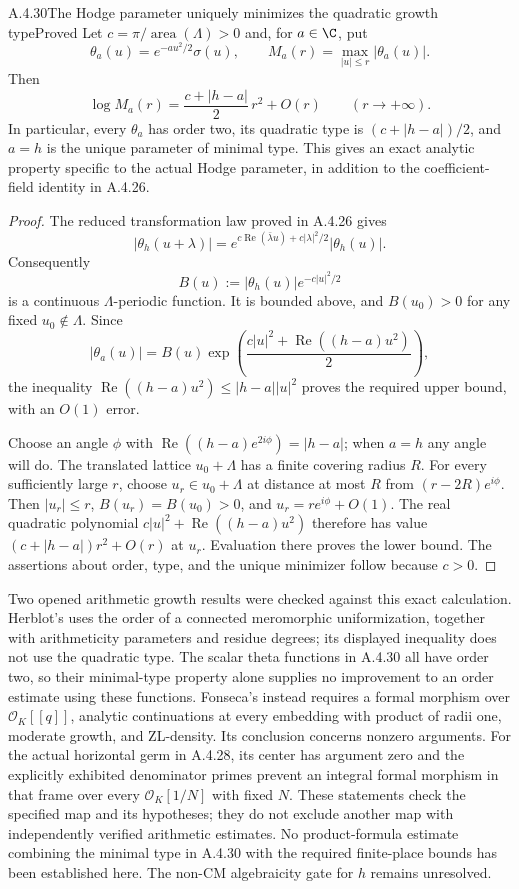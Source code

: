 \begin{result}{A.4.30}{The Hodge parameter uniquely minimizes the quadratic growth type}{Proved}
Let $c=\pi/\operatorname{area}(\Lambda)>0$ and, for $a\in\C$, put
\[
 \theta_a(u)=e^{-au^2/2}\sigma(u),\qquad
 M_a(r)=\max_{|u|\le r}|\theta_a(u)|.
\]
Then
\[
 \log M_a(r)=\frac{c+|h-a|}{2}\,r^2+O(r)
 \qquad(r\longrightarrow+\infty).
\]
In particular, every $\theta_a$ has order two, its quadratic type is
$(c+|h-a|)/2$, and $a=h$ is the unique parameter of minimal type.
This gives an exact analytic property specific to the actual Hodge
parameter, in addition to the coefficient-field identity in A.4.26.
\end{result}
\begin{proof}
The reduced transformation law proved in A.4.26 gives
\[
 |\theta_h(u+\lambda)|
 =e^{c\operatorname{Re}(\bar\lambda u)+c|\lambda|^2/2}
   |\theta_h(u)|.
\]
Consequently
\[
 B(u):=|\theta_h(u)|e^{-c|u|^2/2}
\]
is a continuous $\Lambda$-periodic function. It is bounded above,
and $B(u_0)>0$ for any fixed $u_0\notin\Lambda$. Since
\[
 |\theta_a(u)|=
 B(u)\exp\!\left(\frac{c|u|^2+
                 \operatorname{Re}((h-a)u^2)}2\right),
\]
the inequality
$\operatorname{Re}((h-a)u^2)\le |h-a||u|^2$
proves the required upper bound, with an $O(1)$ error.

Choose an angle $\phi$ with
$\operatorname{Re}((h-a)e^{2i\phi})=|h-a|$; when $a=h$ any
angle will do. The translated lattice $u_0+\Lambda$ has a finite
covering radius $R$. For every sufficiently large $r$, choose
$u_r\in u_0+\Lambda$ at distance at most $R$ from
$(r-2R)e^{i\phi}$. Then $|u_r|\le r$, $B(u_r)=B(u_0)>0$, and
$u_r=re^{i\phi}+O(1)$. The real quadratic polynomial
$c|u|^2+\operatorname{Re}((h-a)u^2)$ therefore has value
$(c+|h-a|)r^2+O(r)$ at $u_r$. Evaluation there proves the lower
bound. The assertions about order, type, and the unique minimizer
follow because $c>0$.
\end{proof}

Two opened arithmetic growth results were checked against this exact
calculation. Herblot's \cite[Theorem 6.1, pp.31--32]{EllHerblot2012}
uses the order of a connected meromorphic uniformization, together
with arithmeticity parameters and residue degrees; its displayed
inequality does not use the quadratic type. The scalar theta
functions in A.4.30 all have order two, so their minimal-type
property alone supplies no improvement to an order estimate using
these functions.
Fonseca's \cite[Theorem 1.2, p.648]{EllFonseca2019} instead requires
a formal morphism over $\mathcal O_K[[q]]$, analytic continuations at
every embedding with product of radii one, moderate growth, and
ZL-density. Its conclusion concerns nonzero arguments.
For the actual horizontal germ in A.4.28, its center has argument
zero and the explicitly exhibited denominator primes prevent an
integral formal morphism in that frame over every
$\mathcal O_K[1/N]$ with fixed $N$. These statements check the
specified map and its hypotheses; they do not exclude another
map with independently verified arithmetic estimates.
No product-formula estimate combining the minimal type in A.4.30
with the required finite-place bounds has been established here.
The non-CM algebraicity gate for $h$ remains unresolved.

